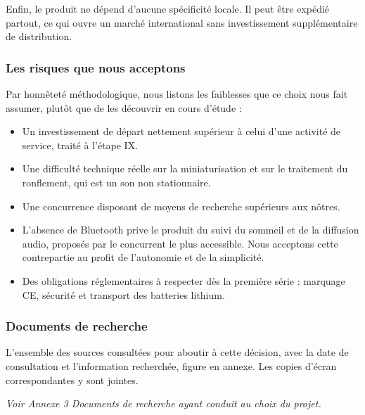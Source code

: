 Enfin, le produit ne dépend d'aucune spécificité locale. Il peut être expédié
partout, ce qui ouvre un marché international sans investissement supplémentaire
de distribution.

\subsubsection{Les risques que nous acceptons}

Par honnêteté méthodologique, nous listons les faiblesses que ce choix nous fait
assumer, plutôt que de les découvrir en cours d'étude :

\begin{itemize}
  \item Un investissement de départ nettement supérieur à celui d'une activité
        de service, traité à l'étape IX.
  \item Une difficulté technique réelle sur la miniaturisation et sur le
        traitement du ronflement, qui est un son non stationnaire.
  \item Une concurrence disposant de moyens de recherche supérieurs aux nôtres.
  \item L'absence de Bluetooth prive le produit du suivi du sommeil et de la
        diffusion audio, proposés par le concurrent le plus accessible. Nous
        acceptons cette contrepartie au profit de l'autonomie et de la
        simplicité.
  \item Des obligations réglementaires à respecter dès la première série :
        marquage CE, sécurité et transport des batteries lithium.
\end{itemize}

\subsubsection{Documents de recherche}

L'ensemble des sources consultées pour aboutir à cette décision, avec la date de
consultation et l'information recherchée, figure en annexe. Les copies d'écran
correspondantes y sont jointes.

\vspace{0.5em}
\textit{Voir Annexe 3 \textendash{} Documents de recherche ayant conduit au choix
du projet.}
